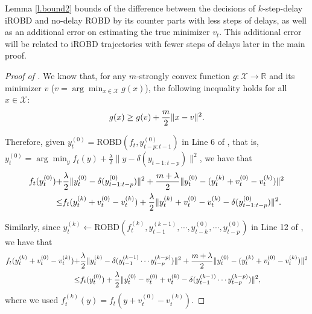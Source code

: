 Lemma \ref{l.bound2} bounds of the difference between the decisions of $k$-step-delay iROBD and no-delay ROBD by its counter parts with less steps of delays, as well as an additional error on estimating the true minimizer $v_t$. This additional error will be related to iROBD trajectories with fewer steps of delays later in the main proof. 

\begin{proof}[Proof of ]
We know that, for any $m$-strongly convex function $g:\mathcal{X}\to\mathbb{R}$ and its minimizer $v$ ($v=\arg\min_{x\in\mathcal{X}}g(x)$), the following inequality holds for all $x\in\mathcal{X}$:
\begin{align}
    g(x)\ge g(v)+\frac{m}{2}\|x-v\|^2.\notag
\end{align}

Therefore, given $y_t^{(0)}=$ROBD$(f_t,y_{t-p:t-1}^{(0)})$ in Line 6 of , that is, $y_t^{(0)}=\arg\min_yf_t(y)+\frac{\lambda}{2}\|y-\delta(y_{t-1:t-p})\|^2$, we have that
\begin{align}
    f_t(y_t^{(0)})+&\frac{\lambda}{2}\|y_t^{(0)}-\delta(y_{t-1:t-p}^{(0)})\|^2+\frac{m+\lambda}{2}\|y_t^{(0)}-(y_t^{(k)}+v_t^{(0)}-v_t^{(k)})\|^2\notag\\
\le&f_t(y_t^{(k)}+v_t^{(0)}-v_t^{(k)})+\frac{\lambda}{2}\|y_t^{(k)}+v_t^{(0)}-v_t^{(k)}-\delta(y_{t-1:t-p}^{(0)})\|^2.\notag
\end{align}

Similarly, since $y_{t}^{(k)}\leftarrow\mathrm{ROBD}(f_{t}^{(k)},y_{t-1}^{(k-1)},\cdots,y_{t-k}^{(0)},\cdots,y_{t-p}^{(0)})$ in Line 12 of , we have that 
\begin{align}
    f_t(y_t^{(k)}+v_t^{(0)}-v_t^{(k)})+&\frac{\lambda}{2}\|y_t^{(k)}-\delta(y_{t-1}^{(k-1)}\cdots y_{t-p}^{(k-p)})\|^2+\frac{m+\lambda}{2}\|y_t^{(0)}-(y_t^{(k)}+v_t^{(0)}-v_t^{(k)})\|^2\notag\\
\le&f_t(y_t^{(0)})+\frac{\lambda}{2}\|y_t^{(0)}-v_t^{(0)}+v_t^{(k)}-\delta(y_{t-1}^{(k-1)}\cdots y_{t-p}^{(k-p)})\|^2,\notag    
\end{align}
where we used $f_t^{(k)}(y) = f_t(y + v_t^{(0)} - v_t^{(k)})$.


\end{proof}
